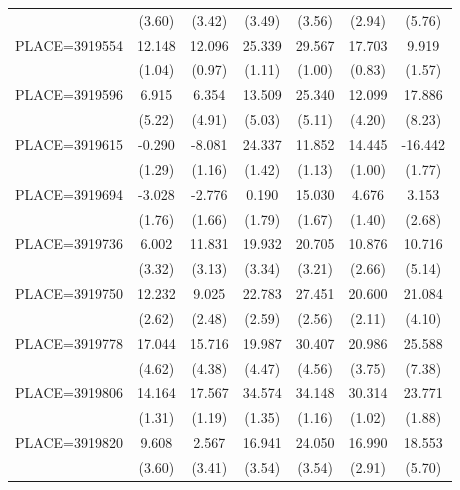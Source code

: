 {\begin{tabular}{l*{6}{c}}
                    &      (3.60)&      (3.42)&      (3.49)&      (3.56)&      (2.94)&      (5.76)\\
PLACE=3919554       &      12.148&      12.096&      25.339&      29.567&      17.703&       9.919\\
                    &      (1.04)&      (0.97)&      (1.11)&      (1.00)&      (0.83)&      (1.57)\\
PLACE=3919596       &       6.915&       6.354&      13.509&      25.340&      12.099&      17.886\\
                    &      (5.22)&      (4.91)&      (5.03)&      (5.11)&      (4.20)&      (8.23)\\
PLACE=3919615       &      -0.290&      -8.081&      24.337&      11.852&      14.445&     -16.442\\
                    &      (1.29)&      (1.16)&      (1.42)&      (1.13)&      (1.00)&      (1.77)\\
PLACE=3919694       &      -3.028&      -2.776&       0.190&      15.030&       4.676&       3.153\\
                    &      (1.76)&      (1.66)&      (1.79)&      (1.67)&      (1.40)&      (2.68)\\
PLACE=3919736       &       6.002&      11.831&      19.932&      20.705&      10.876&      10.716\\
                    &      (3.32)&      (3.13)&      (3.34)&      (3.21)&      (2.66)&      (5.14)\\
PLACE=3919750       &      12.232&       9.025&      22.783&      27.451&      20.600&      21.084\\
                    &      (2.62)&      (2.48)&      (2.59)&      (2.56)&      (2.11)&      (4.10)\\
PLACE=3919778       &      17.044&      15.716&      19.987&      30.407&      20.986&      25.588\\
                    &      (4.62)&      (4.38)&      (4.47)&      (4.56)&      (3.75)&      (7.38)\\
PLACE=3919806       &      14.164&      17.567&      34.574&      34.148&      30.314&      23.771\\
                    &      (1.31)&      (1.19)&      (1.35)&      (1.16)&      (1.02)&      (1.88)\\
PLACE=3919820       &       9.608&       2.567&      16.941&      24.050&      16.990&      18.553\\
                    &      (3.60)&      (3.41)&      (3.54)&      (3.54)&      (2.91)&      (5.70)\\

\end{tabular}}
